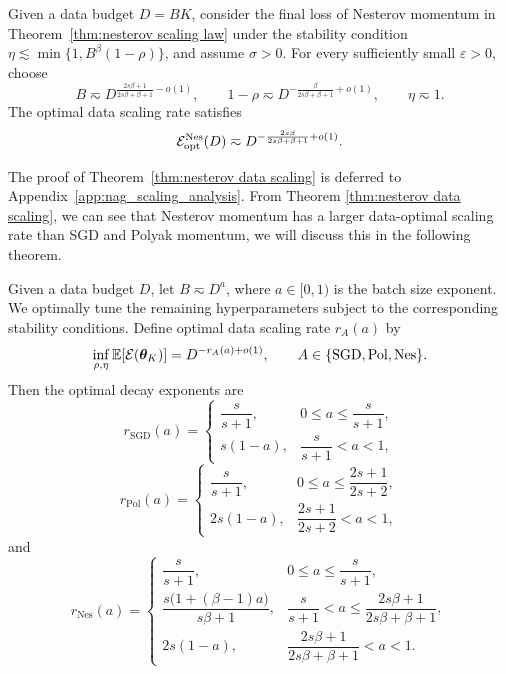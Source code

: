 \documentclass[11pt]{article}
\begin{document}
\begin{theorem}
\label{thm:nesterov data scaling}
Given a data budget \(D=BK\), consider the final loss of Nesterov momentum in
Theorem~\ref{thm:nesterov scaling law} under the stability condition
\(\eta\lesssim\min\{1,B^\beta(1-\rho)\}\), and assume \(\sigma>0\).
For every sufficiently small \(\varepsilon>0\), choose
\[
B\eqsim
D^{\frac{2s\beta+1}{2s\beta+\beta+1}-o(1)},
\qquad
1-\rho\eqsim
D^{-\frac{\beta}{2s\beta+\beta+1}+o(1)},
\qquad
\eta\eqsim1.
\]
The optimal data scaling rate satisfies
\[
\mathcal{E}_{\rm opt}^{\rm Nes}(D)
\eqsim
D^{-\frac{2s\beta}{2s\beta+\beta+1}
+o(1)}.
\]
\end{theorem}

The proof of Theorem~\ref{thm:nesterov data scaling} is deferred to
Appendix~\ref{app:nag_scaling_analysis}. From Theorem \ref{thm:nesterov data scaling}, we can see that Nesterov momentum has a larger data-optimal scaling rate than SGD and Polyak momentum, we will discuss this in the following theorem.

\begin{theorem}
\label{thm:fixed-batch-data-scaling}
Given a data budget \(D\), let \(B\eqsim D^a\), where \(a\in[0,1)\) is the batch size exponent. We optimally tune the remaining hyperparameters subject to the corresponding stability conditions. Define optimal data scaling rate \(r_A(a)\) by
\[
\inf_{\rho,\eta}
\mathbb{E}[\mathcal{E}(\bm{\theta}_K)]
=
D^{-r_A(a)+o(1)},
\qquad
A\in\{\mathrm{SGD},\mathrm{Pol},\mathrm{Nes}\}.
\]
Then the optimal decay exponents are
\[
r_{\mathrm{SGD}}(a)
=
\begin{cases}
\dfrac{s}{s+1},
& 0\leq a\leq \dfrac{s}{s+1},\\[1mm]
s(1-a),
& \dfrac{s}{s+1}<a<1,
\end{cases}
\]
\[
r_{\mathrm{Pol}}(a)
=
\begin{cases}
\dfrac{s}{s+1},
& 0\leq a\leq \dfrac{2s+1}{2s+2},\\[1mm]
2s(1-a),
& \dfrac{2s+1}{2s+2}<a<1,
\end{cases}
\]
and
\[
r_{\mathrm{Nes}}(a)
=
\begin{cases}
\dfrac{s}{s+1},
& 0\leq a\leq \dfrac{s}{s+1},\\[1mm]
\dfrac{s\bigl(1+(\beta-1)a\bigr)}{s\beta+1},
& \dfrac{s}{s+1}<a\leq
\dfrac{2s\beta+1}{2s\beta+\beta+1},\\[2mm]
2s(1-a),
& \dfrac{2s\beta+1}{2s\beta+\beta+1}<a<1.
\end{cases}
\]
\end{theorem}
\end{document}
